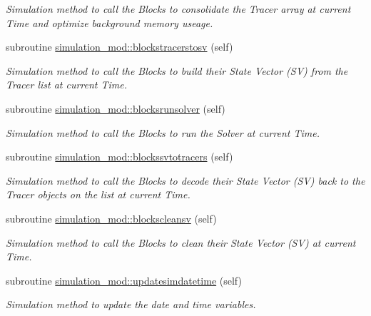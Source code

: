 \begin{DoxyCompactItemize}
\begin{DoxyCompactList}\small\item\em Simulation method to call the Blocks to consolidate the Tracer array at current Time and optimize background memory useage. \end{DoxyCompactList}\item 
subroutine \mbox{\hyperlink{namespacesimulation__mod_a2fbc294996a615647983ec637b83cfc0}{simulation\+\_\+mod\+::blockstracerstosv}} (self)
\begin{DoxyCompactList}\small\item\em Simulation method to call the Blocks to build their State Vector (SV) from the Tracer list at current Time. \end{DoxyCompactList}\item 
subroutine \mbox{\hyperlink{namespacesimulation__mod_ab2e7a1b0f131ab6fe40454d32cb3e24f}{simulation\+\_\+mod\+::blocksrunsolver}} (self)
\begin{DoxyCompactList}\small\item\em Simulation method to call the Blocks to run the Solver at current Time. \end{DoxyCompactList}\item 
subroutine \mbox{\hyperlink{namespacesimulation__mod_a5eeea0cb6e0e94c5fd0336a13d635866}{simulation\+\_\+mod\+::blockssvtotracers}} (self)
\begin{DoxyCompactList}\small\item\em Simulation method to call the Blocks to decode their State Vector (SV) back to the Tracer objects on the list at current Time. \end{DoxyCompactList}\item 
subroutine \mbox{\hyperlink{namespacesimulation__mod_a4cec8fb4baf1b2f69cd2699b0c5b9a55}{simulation\+\_\+mod\+::blockscleansv}} (self)
\begin{DoxyCompactList}\small\item\em Simulation method to call the Blocks to clean their State Vector (SV) at current Time. \end{DoxyCompactList}\item 
subroutine \mbox{\hyperlink{namespacesimulation__mod_a844f0fae91502f3fc79cc1223f55a86c}{simulation\+\_\+mod\+::updatesimdatetime}} (self)
\begin{DoxyCompactList}\small\item\em Simulation method to update the date and time variables. \end{DoxyCompactList}\item 

\end{DoxyCompactItemize}
